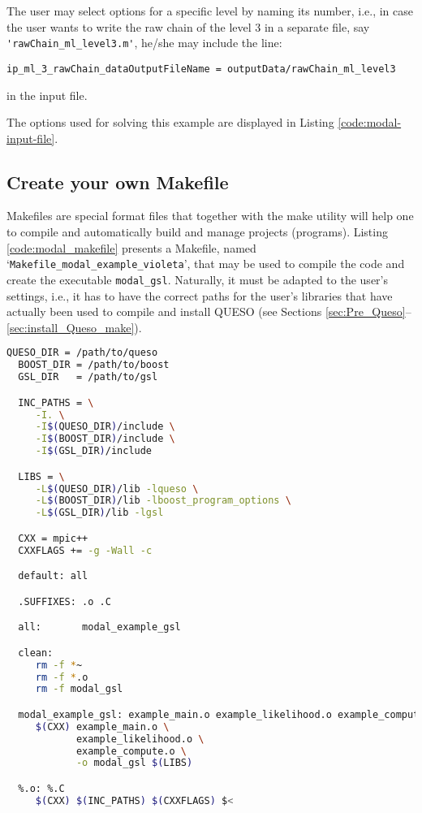 The user may select options for a specific level by naming its number, i.e., in case the user wants to write the raw chain of the level 3 in a separate file, say \verb+'rawChain_ml_level3.m'+, he/she may include the line:
\begin{lstlisting}
ip_ml_3_rawChain_dataOutputFileName = outputData/rawChain_ml_level3
\end{lstlisting}
in the input file.


The options used for solving this example are displayed in Listing \ref{code:modal-input-file}.





\subsection{Create your own Makefile}\label{sec:modal-makefile}

Makefiles are special format files that together with the make utility will help one to compile and automatically build and manage projects (programs).
Listing \ref{code:modal_makefile} presents a Makefile, named `\texttt{Makefile\_modal\_example\_violeta}', that may be used to compile the code and create the executable \verb+modal_gsl+. Naturally, it must be adapted to the user's settings, i.e., it has to have the correct paths for the user's libraries that have actually been used to compile and install QUESO  (see Sections \ref{sec:Pre_Queso}--\ref{sec:install_Queso_make}).

\begin{lstlisting}[caption={Makefile for the application code in Listings
  \ref{code:modal-main-c}-\ref{code:modal-compute-c}},
  label={code:modal_makefile},
  language={bash}]
  QUESO_DIR = /path/to/queso
  BOOST_DIR = /path/to/boost
  GSL_DIR   = /path/to/gsl

  INC_PATHS = \
     -I. \
     -I$(QUESO_DIR)/include \
     -I$(BOOST_DIR)/include \
     -I$(GSL_DIR)/include

  LIBS = \
     -L$(QUESO_DIR)/lib -lqueso \
     -L$(BOOST_DIR)/lib -lboost_program_options \
     -L$(GSL_DIR)/lib -lgsl

  CXX = mpic++
  CXXFLAGS += -g -Wall -c

  default: all

  .SUFFIXES: .o .C

  all:       modal_example_gsl

  clean:
     rm -f *~
     rm -f *.o
     rm -f modal_gsl

  modal_example_gsl: example_main.o example_likelihood.o example_compute.o
     $(CXX) example_main.o \
            example_likelihood.o \
            example_compute.o \
            -o modal_gsl $(LIBS)

  %.o: %.C
     $(CXX) $(INC_PATHS) $(CXXFLAGS) $<
\end{lstlisting}

